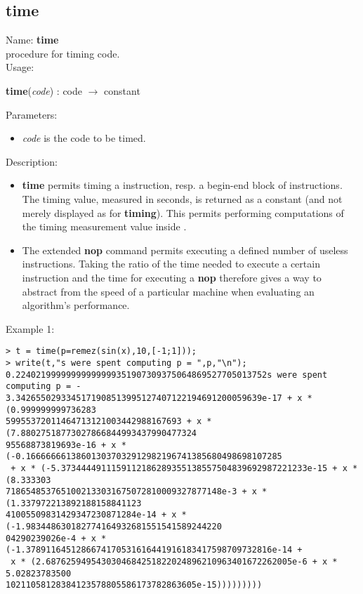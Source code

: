 \subsection{time}
\label{labtime}
\noindent Name: \textbf{time}\\
procedure for timing \sollya code.\\
\noindent Usage: 
\begin{center}
\textbf{time}(\emph{code}) : \textsf{code} $\rightarrow$ \textsf{constant}\\
\end{center}
Parameters: 
\begin{itemize}
\item \emph{code} is the code to be timed.
\end{itemize}
\noindent Description: \begin{itemize}

\item \textbf{time} permits timing a \sollya instruction, resp. a begin-end block
   of \sollya instructions. The timing value, measured in seconds, is returned
   as a \sollya constant (and not merely displayed as for \textbf{timing}). This 
   permits performing computations of the timing measurement value inside \sollya.

\item The extended \textbf{nop} command permits executing a defined number of
   useless instructions. Taking the ratio of the time needed to execute a
   certain \sollya instruction and the time for executing a \textbf{nop}
   therefore gives a way to abstract from the speed of a particular 
   machine when evaluating an algorithm's performance.
\end{itemize}
\noindent Example 1: 
\begin{center}\begin{minipage}{15cm}\begin{Verbatim}[frame=single]
> t = time(p=remez(sin(x),10,[-1;1]));
> write(t,"s were spent computing p = ",p,"\n");
0.22402199999999999999351907309375064869527705013752s were spent computing p = -
3.3426550293345171908513995127407122194691200059639e-17 + x * (0.999999999736283
59955372011464713121003442988167693 + x * (7.88027518773027866844993437990477324
95568873819693e-16 + x * (-0.166666661386013037032912982196741385680498698107285
 + x * (-5.3734444911159112186289355138557504839692987221233e-15 + x * (8.333303
7186548537651002133031675072810009327877148e-3 + x * (1.337972213892188158841123
41005509831429347230871284e-14 + x * (-1.983448630182774164932681551541589244220
04290239026e-4 + x * (-1.3789116451286674170531616441916183417598709732816e-14 +
 x * (2.6876259495430304684251822024896210963401672262005e-6 + x * 5.02823783500
10211058128384123578805586173782863605e-15)))))))))
\end{Verbatim}
\end{minipage}\end{center}

